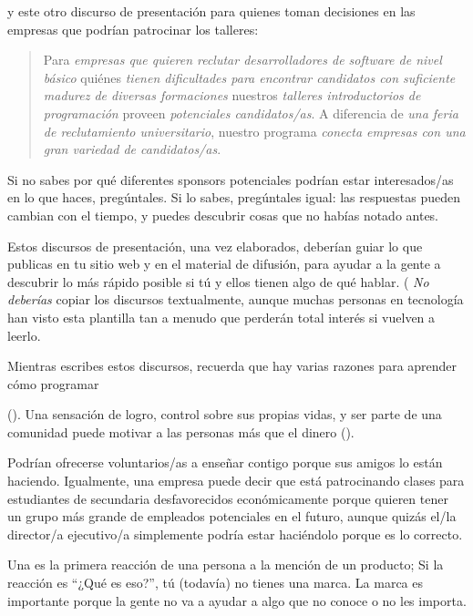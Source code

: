 \noindent
y este otro discurso de presentación para quienes toman decisiones en las empresas que podrían patrocinar los talleres:

\begin{quote}

  Para \emph{empresas que quieren reclutar desarrolladores de software de nivel básico}
  quiénes \emph{tienen dificultades para  encontrar candidatos con suficiente madurez  de diversas formaciones}
  nuestros \emph{talleres introductorios de programación}
  proveen \emph{potenciales candidatos/as}.
  A diferencia de \emph{una feria de reclutamiento universitario},
  nuestro programa \emph{conecta empresas con una gran variedad de candidatos/as}.
\end{quote}

Si no sabes por qué diferentes sponsors potenciales podrían estar interesados/as en lo que haces,
pregúntales.
Si lo sabes,
pregúntales igual:
las respuestas pueden cambian con el tiempo,
y puedes descubrir cosas que no habías notado antes.

Estos discursos de presentación, una vez elaborados,
deberían guiar lo que publicas en tu sitio web y en el material de difusión,
para ayudar a la gente a descubrir lo más rápido posible
si tú y ellos tienen algo de qué hablar.
( \emph{No deberías} copiar los discursos textualmente,
aunque
muchas personas en tecnología han visto esta plantilla tan a menudo que 
perderán total interés si vuelven a leerlo. 

Mientras escribes estos discursos,
recuerda que hay varias razones para aprender cómo programar

().
Una sensación de logro,
control sobre sus propias vidas,
y ser parte de una comunidad puede motivar a las personas más que el dinero
().

Podrían ofrecerse voluntarios/as a enseñar contigo  
porque sus amigos lo están haciendo. Igualmente, una empresa puede decir que 
está patrocinando clases para estudiantes de secundaria desfavorecidos económicamente 
porque quieren tener un grupo más grande de empleados potenciales en el futuro, 
aunque quizás el/la director/a ejecutivo/a simplemente podría estar haciéndolo porque es lo correcto.


Una  es la primera reacción de una persona a la mención de un producto;
Si la reacción es ``¿Qué es eso?'',
tú (todavía) no tienes una marca.
La marca es importante porque
la gente no va a ayudar a algo que no conoce o no les importa.

